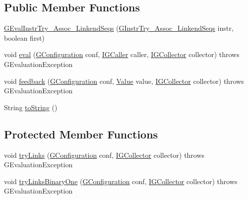 \subsection*{Public Member Functions}
\begin{DoxyCompactItemize}
\item 
\hyperlink{classorg_1_1tzi_1_1use_1_1gen_1_1assl_1_1dynamics_1_1_g_eval_instr_try___assoc___linkend_seqs_a37f4727252360c4611e1e00f94a19beb}{G\-Eval\-Instr\-Try\-\_\-\-Assoc\-\_\-\-Linkend\-Seqs} (\hyperlink{classorg_1_1tzi_1_1use_1_1gen_1_1assl_1_1statics_1_1_g_instr_try___assoc___linkend_seqs}{G\-Instr\-Try\-\_\-\-Assoc\-\_\-\-Linkend\-Seqs} instr, boolean first)
\item 
void \hyperlink{classorg_1_1tzi_1_1use_1_1gen_1_1assl_1_1dynamics_1_1_g_eval_instr_try___assoc___linkend_seqs_a51e908aafaebc6cd2acf392729775ccf}{eval} (\hyperlink{classorg_1_1tzi_1_1use_1_1gen_1_1assl_1_1dynamics_1_1_g_configuration}{G\-Configuration} conf, \hyperlink{interfaceorg_1_1tzi_1_1use_1_1gen_1_1assl_1_1dynamics_1_1_i_g_caller}{I\-G\-Caller} caller, \hyperlink{interfaceorg_1_1tzi_1_1use_1_1gen_1_1assl_1_1dynamics_1_1_i_g_collector}{I\-G\-Collector} collector)  throws G\-Evaluation\-Exception 
\item 
void \hyperlink{classorg_1_1tzi_1_1use_1_1gen_1_1assl_1_1dynamics_1_1_g_eval_instr_try___assoc___linkend_seqs_a559111eb13e24e58c2afa01ebce8f877}{feedback} (\hyperlink{classorg_1_1tzi_1_1use_1_1gen_1_1assl_1_1dynamics_1_1_g_configuration}{G\-Configuration} conf, \hyperlink{classorg_1_1tzi_1_1use_1_1uml_1_1ocl_1_1value_1_1_value}{Value} value, \hyperlink{interfaceorg_1_1tzi_1_1use_1_1gen_1_1assl_1_1dynamics_1_1_i_g_collector}{I\-G\-Collector} collector)  throws G\-Evaluation\-Exception 
\item 
String \hyperlink{classorg_1_1tzi_1_1use_1_1gen_1_1assl_1_1dynamics_1_1_g_eval_instr_try___assoc___linkend_seqs_aaac066d0a07ebdfafad55864df9d79a7}{to\-String} ()
\end{DoxyCompactItemize}
\subsection*{Protected Member Functions}
\begin{DoxyCompactItemize}
\item 
void \hyperlink{classorg_1_1tzi_1_1use_1_1gen_1_1assl_1_1dynamics_1_1_g_eval_instr_try___assoc___linkend_seqs_a19fb1830b43d69374f371754ced46949}{try\-Links} (\hyperlink{classorg_1_1tzi_1_1use_1_1gen_1_1assl_1_1dynamics_1_1_g_configuration}{G\-Configuration} conf, \hyperlink{interfaceorg_1_1tzi_1_1use_1_1gen_1_1assl_1_1dynamics_1_1_i_g_collector}{I\-G\-Collector} collector)  throws G\-Evaluation\-Exception 
\item 
void \hyperlink{classorg_1_1tzi_1_1use_1_1gen_1_1assl_1_1dynamics_1_1_g_eval_instr_try___assoc___linkend_seqs_afb96c31f114bcc2a7f91b34e6440720d}{try\-Links\-Binary\-One} (\hyperlink{classorg_1_1tzi_1_1use_1_1gen_1_1assl_1_1dynamics_1_1_g_configuration}{G\-Configuration} conf, \hyperlink{interfaceorg_1_1tzi_1_1use_1_1gen_1_1assl_1_1dynamics_1_1_i_g_collector}{I\-G\-Collector} collector)  throws G\-Evaluation\-Exception 
\end{DoxyCompactItemize}
